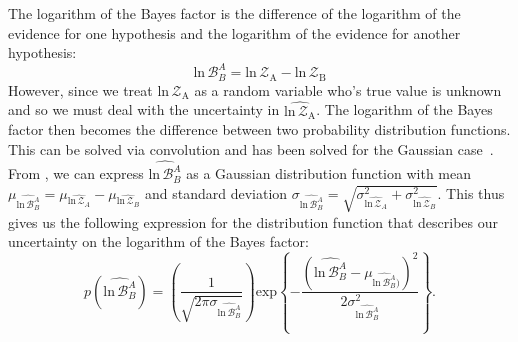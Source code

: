 The logarithm of the Bayes factor is the difference of the logarithm of the evidence for one hypothesis and the logarithm of the evidence for another hypothesis:
\begin{equation}\label{eqn:log_bayes_factor}
    \mathrm{ln} \, \mathcal{B}^A_B = \mathrm{ln} \, \mathcal{Z}_{\mathrm{A}} - \mathrm{ln} \, \mathcal{Z}_{\mathrm{B}}
\end{equation}
However, since we treat $\mathrm{ln} \, \mathcal{Z}_{\mathrm{A}}$ as a random variable who's true value is unknown and so we must deal with the uncertainty in $\widehat{\mathrm{ln} \, \mathcal{Z}_{\mathrm{A}}}$. The logarithm of the Bayes factor then becomes the difference between two probability distribution functions. This can be solved via convolution and has been solved for the Gaussian case~\citep{bromiley2003products}. From \cite{bormily}, we can express $\widehat{\mathrm{ln} \, \mathcal{B}^A_B}$ as a Gaussian distribution function with mean $\mu_{\widehat{\mathrm{ln} \, \mathcal{B}^A_B}} = \mu_{\widehat{\mathrm{ln} \, \mathcal{Z}_A}} - \mu_{\widehat{\mathrm{ln} \, \mathcal{Z}_B}}$ and standard deviation $\sigma_{\widehat{\mathrm{ln} \, \mathcal{B}^A_B}} = \sqrt{\sigma_{\widehat{\mathrm{ln} \, \mathcal{Z}_A}}^2 + \sigma_{\widehat{\mathrm{ln} \, \mathcal{Z}_B}}^2 }$. This thus gives us the following expression for the distribution function that describes our uncertainty on the logarithm of the Bayes factor:
\begin{equation}\label{eqn:p_log_b}
    p(\widehat{\mathrm{ln} \, \mathcal{B}^A_B}) = \left(\frac{1}{\sqrt{2 \pi \sigma_{\widehat{\mathrm{ln} \, \mathcal{B}^A_B}}}} \right) \mathrm{exp} \left \{-\frac{\left(\widehat{\mathrm{ln} \, \mathcal{B}^A_B} - \mu_{\widehat{\mathrm{ln} \, \mathcal{B}^A_B})}\right)^2} {2 \sigma^2_{\widehat{\mathrm{ln} \, \mathcal{B}^A_B}}}  \right\}.
\end{equation}


